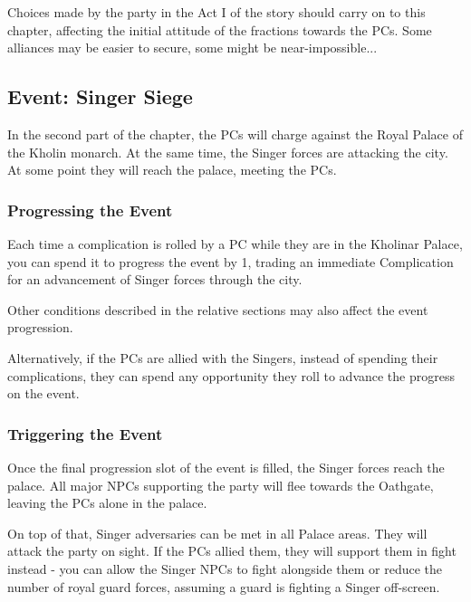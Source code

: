 Choices made by the party in the Act I of the story should carry on to this chapter, affecting the initial attitude of the fractions towards the PCs. Some alliances may be easier to secure, some might be near-impossible...


\subsection{Event: Singer Siege}
\label{ssec:singerSiegeEvent}

In the second part of the chapter, the PCs will charge against the Royal Palace of the Kholin monarch. At the same time, the Singer forces are attacking the city. At some point they will reach the palace, meeting the PCs.


\subsubsection{Progressing the Event}

Each time a complication is rolled by a PC while they are in the Kholinar Palace, you can spend it to progress the event by 1, trading an immediate Complication for an advancement of Singer forces through the city.

Other conditions described in the relative sections may also affect the event progression.

Alternatively, if the PCs are allied with the Singers, instead of spending their complications, they can spend any opportunity they roll to advance the progress on the event.

\subsubsection{Triggering the Event}

Once the final progression slot of the event is filled, the Singer forces reach the palace. All major NPCs supporting the party will flee towards the Oathgate, leaving the PCs alone in the palace.

On top of that, Singer adversaries can be met in all Palace areas. They will attack the party on sight. If the PCs allied them, they will support them in fight instead - you can allow the Singer NPCs to fight alongside them or reduce the number of royal guard forces, assuming a guard is fighting a Singer off-screen.




